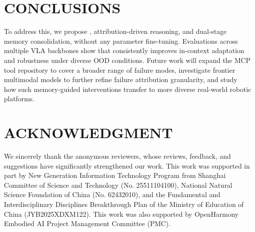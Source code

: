 \section{CONCLUSIONS}

To address this, we propose {\sys}, 
attribution-driven reasoning, and dual-stage memory consolidation, without any parameter fine-tuning.
Evaluations across multiple VLA backbones show that {\sys} consistently 
improves in-context adaptation and robustness under diverse OOD conditions.
Future work will expand the MCP tool repository to cover a broader range of failure modes, 
investigate frontier multimodal models to further refine failure attribution granularity,
and study how such memory-guided interventions transfer to more diverse real-world robotic platforms.

\section*{ACKNOWLEDGMENT}

We sincerely thank the anonymous reviewers, whose reviews, feedback, and
suggestions have significantly strengthened our work. This
work was supported in part by New Generation Information Technology Program from
Shanghai Committee of Science and Technology (No. 25511104100), National Natural
Science Foundation of China (No. 62432010), and the Fundamental and
Interdisciplinary Disciplines Breakthrough Plan of the Ministry of Education of
China (JYB2025XDXM122). This work was also supported by OpenHarmony Embodied AI
Project Management Committee (PMC).
